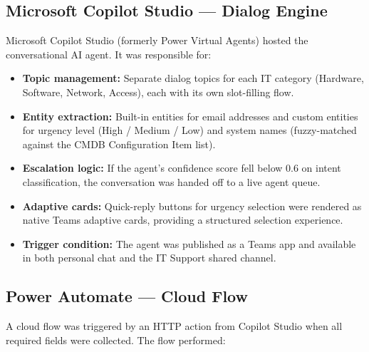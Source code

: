 \documentclass[12pt, a4paper]{article}
\begin{document}
\subsection{Microsoft Copilot Studio --- Dialog Engine}

Microsoft Copilot Studio (formerly Power Virtual Agents) hosted the conversational AI
agent. It was responsible for:

\begin{itemize}[leftmargin=*]
  \item \textbf{Topic management:} Separate dialog topics for each IT category
        (Hardware, Software, Network, Access), each with its own slot-filling flow.
  \item \textbf{Entity extraction:} Built-in entities for email addresses and custom
        entities for urgency level (High / Medium / Low) and system names (fuzzy-matched
        against the CMDB Configuration Item list).
  \item \textbf{Escalation logic:} If the agent's confidence score fell below 0.6 on
        intent classification, the conversation was handed off to a live agent queue.
  \item \textbf{Adaptive cards:} Quick-reply buttons for urgency selection were rendered
        as native Teams adaptive cards, providing a structured selection experience.
  \item \textbf{Trigger condition:} The agent was published as a Teams app and available
        in both personal chat and the IT Support shared channel.
\end{itemize}

\subsection{Power Automate --- Cloud Flow}

A cloud flow was triggered by an HTTP action from Copilot Studio when all required fields
were collected. The flow performed:
\end{document}
